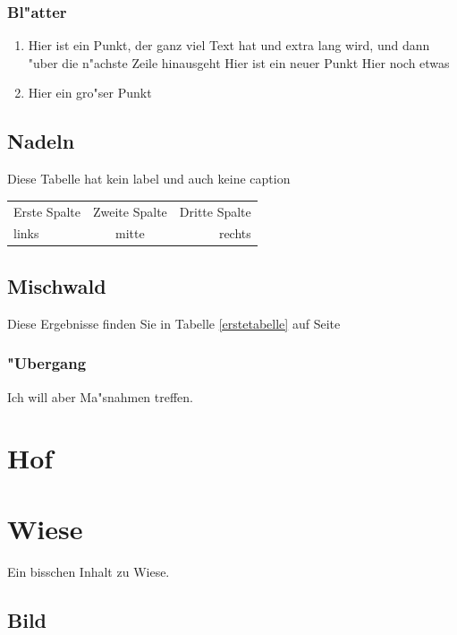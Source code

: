 \documentclass{article}
\begin{document}
 \subsubsection{Bl"atter}

	\begin{enumerate}
		\item Hier ist ein Punkt, der ganz viel Text hat und extra lang wird, und dann "uber die n"achste Zeile hinausgeht
		 \subitem Hier ist ein neuer Punkt
		 \subitem Hier noch etwas
		\item Hier ein gro"ser Punkt
	\end{enumerate}
 
 \subsection{Nadeln}

	Diese Tabelle hat kein label und auch keine caption
	
	\begin{tabular}[h]{l|c|r}
 		\hline
		Erste Spalte &	Zweite Spalte	& Dritte Spalte	\\
		links		& mitte		& rechts	\\
		\hline
	\end{tabular}

 \subsection{Mischwald}

 	Diese Ergebnisse finden Sie in Tabelle \ref{erstetabelle} auf Seite \pageref{erstetabelle}

 \subsubsection{"Ubergang}

	Ich will aber Ma"snahmen treffen.

\section{Hof}

\section{Wiese}

	Ein bisschen Inhalt zu Wiese.

\newpage


 \subsection{Bild} \label{sec:bilder}
\end{document}

